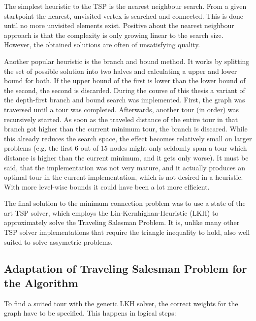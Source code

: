 The simplest heuristic to the TSP is the nearest neighbour search. From a given startpoint the nearest, unvisited vertex is searched and connected. This is done until no more unvisited elements exist. Positive about the nearest neighbour approach is that the complexity is only growing linear to the search size. However, the obtained solutions are often of unsatisfying quality.

Another popular heuristic is the branch and bound method. It works by splitting the set of possible solution into two halves and calculating a upper and lower bound for both. If the upper bound of the first is lower than the lower bound of the second, the second is discarded. During the course of this thesis a variant of the depth-first branch and bound search was implemented. First, the graph was traversed until a tour was completed. Afterwards, another tour (in order) was recursively started. As soon as the traveled distance of the entire tour in that branch got higher than the current minimum tour, the branch is discared. While this already reduces the search space, the effect becomes relatively small on larger problems (e.g. the first 6 out of 15 nodes might only seldomly span a tour which distance is higher than the current minimum, and it gets only worse).  It must be said, that the implementation was not very mature, and it actually produces an optimal tour in the current implementation, which is not desired in a heuristic. With more level-wise bounds it could have been a lot more efficient. 

The final solution to the minimum connection problem was to use a state of the art TSP solver\cite{helsgaun2000effective}, which employs the Lin-Kernhighan-Heuristic\cite{kernighan1970efficient} (LKH) to approximately solve the Traveling Salesman Problem. It is, unlike many other TSP solver implementations that require the triangle inequality to hold, also well suited to solve assymetric problems.
\subsection{Adaptation of Traveling Salesman Problem for the Algorithm}

To find a suited tour with the generic LKH solver, the correct weights for the graph have to be specified. This happens in logical steps:

